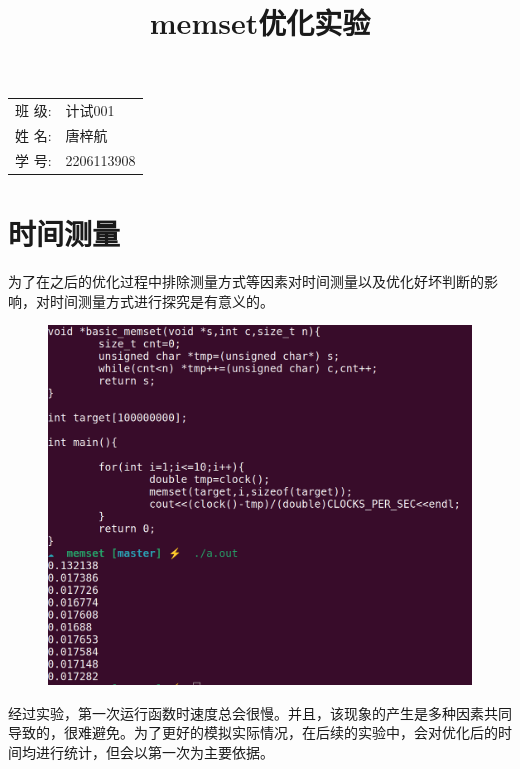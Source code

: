 \documentclass{article}
\title{\heiti memset优化实验 }
\begin{document}
	
	\maketitle
	
	\vspace{5cm}
	
	\begin{table}[h]
		\centering
		\begin{Large}
			\begin{tabular}{p{3cm} p{7cm}<{\centering}}
				班 \qquad 级:      & 计试001   \\ \cline{2-2}
				姓 \qquad 名:      & 唐梓航   \\ \cline{2-2}
				学 \qquad 号:      & 2206113908   \\ \cline{2-2}
			\end{tabular}
		\end{Large}		
	\end{table}
	
	\newpage
	
	\tableofcontents
	
	\newpage
	
	\section{时间测量}
	为了在之后的优化过程中排除测量方式等因素对时间测量以及优化好坏判断的影响，对时间测量方式进行探究是有意义的。
	\begin{figure}[h]
		\centering
		\includegraphics[width=12cm]{./1.png}
	\end{figure}
	经过实验，第一次运行函数时速度总会很慢。并且，该现象的产生是多种因素共同导致的，很难避免。为了更好的模拟实际情况，在后续的实验中，会对优化后的时间均进行统计，但会以第一次为主要依据。
	\newpage
\end{document}
